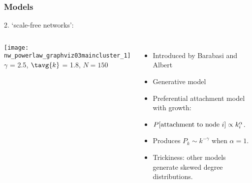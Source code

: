 \begin{frame}
  \frametitle{Models}

  \begin{block}{2. `scale-free networks':}
    \begin{columns}
      \bigskip
      \texttt{[image: nw\_powerlaw\_graphviz03maincluster\_1]}\\
      \bigskip
      \small{$\gamma$ = 2.5},
      \small{$\tavg{k}$ = 1.8},
      \small{$N = 150$}
      \begin{itemize}
      \item<2-> Introduced by Barabasi and Albert\cite{barabasi1999a}
      \item<2-> Generative model
      \item<3-> Preferential attachment model with growth:
      \item<4->  $P[\textnormal{attachment to node}\ i] \propto k_{i}^\alpha$.
      \item<5-> Produces \alert{$P_k \sim k^{-\gamma}$} when $\alpha=1$.
      \item<6-> Trickiness: other models generate skewed degree distributions.
      \end{itemize}
    \end{columns}
  \end{block}

\end{frame}

\begin{frame}
  \showtarotcards{0.35}{
    john-dory,
    overview,
    complex-networks,
    random-networks,
    scale-free-networks,
    small-world-networks,
}
\end{frame}

